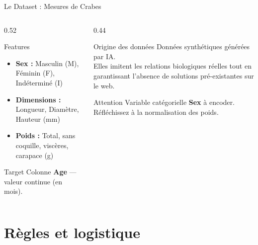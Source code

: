 \documentclass[aspectratio=169, 10pt]{beamer}
\begin{document}
\begin{frame}{Le Dataset : Mesures de Crabes}
  \begin{columns}[T]
    \begin{column}{0.52\textwidth}
      \begin{block}{Features}
        \begin{itemize}
          \item \textbf{Sex :} Masculin (M), Féminin (F), Indéterminé (I)
          \item \textbf{Dimensions :} Longueur, Diamètre, Hauteur (mm)
          \item \textbf{Poids :} Total, sans coquille, viscères, carapace (g)
        \end{itemize}
      \end{block}
      \smallskip
      \begin{block}{Target}
        Colonne \textbf{Age} --- valeur continue (en mois).
      \end{block}
    \end{column}
    \begin{column}{0.44\textwidth}
      \begin{exampleblock}{Origine des données}
        Données synthétiques générées par IA.\\[4pt]
        Elles imitent les relations biologiques réelles tout en
        garantissant l'absence de solutions pré-existantes
        sur le web.
      \end{exampleblock}
      \smallskip
      \begin{alertblock}{Attention}
        Variable catégorielle \textbf{Sex} à encoder.\\
        Réfléchissez à la normalisation des poids.
      \end{alertblock}
    \end{column}
  \end{columns}
\end{frame}

\section{Règles et logistique}
\end{document}
